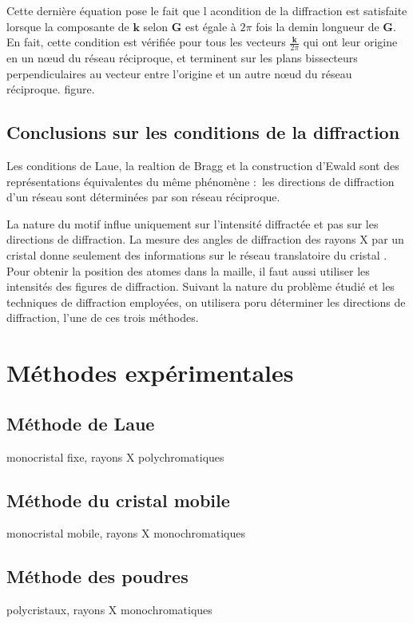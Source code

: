 Cette dernière équation pose le fait que l acondition de la diffraction est
satisfaite lorsque la composante de $\mathbf{k}$ selon $\mathbf{G}$ est égale à
$2\pi$ fois la demin longueur de $\mathbf{G}$. En fait, cette condition est
vérifiée pour tous les vecteurs $\frac{\mathbf{k}}{2\pi}$ qui ont leur origine
en un nœud du réseau réciproque, et terminent sur les plans bissecteurs
perpendiculaires au vecteur entre l'origine et un autre nœud du réseau réciproque. \TODO figure.


 
\subsection{Conclusions sur les conditions de la diffraction}

Les conditions de Laue, la realtion de Bragg et la construction d'Ewald sont des
représentations équivalentes du même phénomène : les directions de diffraction 
d'un réseau sont déterminées par son réseau réciproque.

La nature du motif influe uniquement sur l'intensité diffractée et pas sur les
directions de diffraction. La mesure des angles de diffraction des rayons X par
un cristal donne seulement des informations sur le réseau translatoire du cristal
. Pour obtenir la position des atomes dans la maille, il faut aussi utiliser les
intensités des figures de diffraction. Suivant la nature du problème étudié et
les techniques de diffraction employées, on utilisera poru déterminer les
directions de diffraction, l'une de ces trois méthodes.

 
\section{Méthodes expérimentales}
\subsection{Méthode de Laue}
monocristal fixe, rayons X polychromatiques
\subsection{Méthode du cristal mobile}
monocristal mobile, rayons X monochromatiques
\subsection{Méthode des poudres}
polycristaux, rayons X monochromatiques

